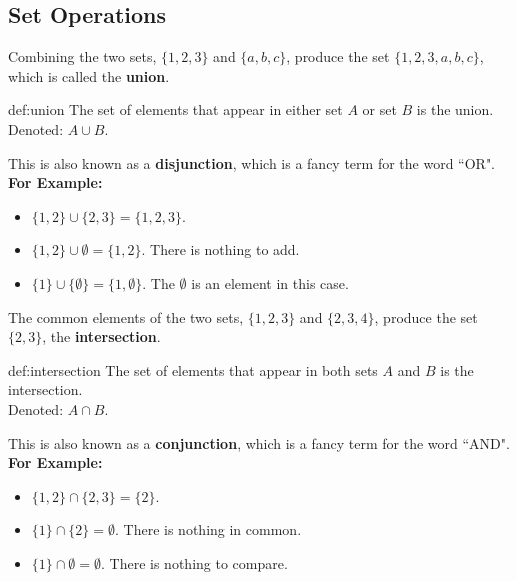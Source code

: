 \subsection{Set Operations}


Combining the two sets, $\{1,2,3\}$ and $\{a,b,c\}$, produce the set $\{1,2,3,a,b,c\}$, which
is called the \textbf{union}.\\

\begin{Def}[Union]{def:union}
    The set of elements that appear in either set $A$ or set $B$ is the union.\\
    Denoted: $A \cup B$.
\end{Def}

\noindent
This is also known as a \textbf{disjunction}, which is a fancy term for the word ``OR".\\

\noindent
\textbf{For Example:}
\begin{itemize}
    \item $\{1, 2\} \cup \{2, 3\} = \{1, 2, 3\}$.
    \item $\{1,2\} \cup \emptyset = \{1, 2\}$. There is nothing to add.
    \item $\{1\} \cup \{\emptyset\} = \{1, \emptyset\}$. The $\emptyset$ is an element in this case.
\end{itemize}

\newpage
\noindent
The common elements of the two sets, $\{1,2,3\}$ and $\{2,3,4\}$, produce the set $\{2,3\}$,
the \textbf{intersection}.\\

\begin{Def}[Intersection]{def:intersection}
    The set of elements that appear in both sets $A$ and $B$ is the intersection.\\
    Denoted: $A \cap B$.
\end{Def}

\noindent
This is also known as a \textbf{conjunction}, which is a fancy term for the word ``AND".\\

\noindent
\textbf{For Example:}
\begin{itemize}
    \item $\{1, 2\} \cap \{2, 3\} = \{2\}$.
    \item $\{1\} \cap \{2\} = \emptyset$. There is nothing in common.
    \item $\{1\} \cap \emptyset = \emptyset$. There is nothing to compare.
\end{itemize}

